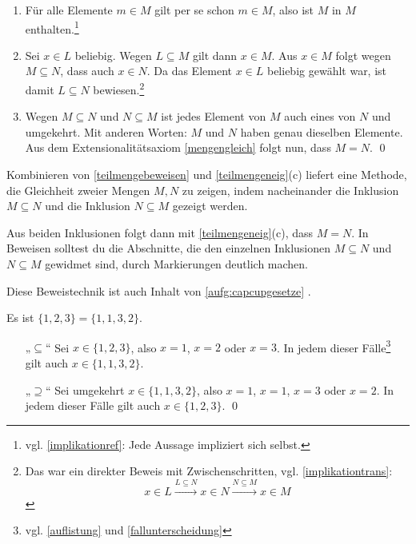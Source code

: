 \begin{bew}
    \begin{enumerate}
        \item Für alle Elemente $m\in M$ gilt per se schon $m\in M$, also ist $M$ in $M$ enthalten.\footnote{vgl. \cref{implikationref}: Jede Aussage impliziert sich selbst.}
        \item Sei $x\in L$ beliebig. Wegen $L\subseteq M$ gilt dann $x\in M$. Aus $x\in M$ folgt wegen $M\subseteq N$, dass auch $x\in N$. Da das Element $x\in L$ beliebig gewählt war, ist damit $L\subseteq N$ bewiesen.\footnote{Das war ein direkter Beweis mit Zwischenschritten, vgl. \cref{implikationtrans}:
            \[ x\in L\xrightarrow{L\subseteq N} x\in N \xrightarrow{N\subseteq M} x\in M \]}
        \item Wegen $M\subseteq N$ und $N\subseteq M$ ist jedes Element von $M$ auch eines von $N$ und umgekehrt. Mit anderen Worten: $M$ und $N$ haben genau dieselben Elemente. Aus dem Extensionalitätsaxiom \cref{mengengleich} folgt nun, dass $M=N$. \qed
    \end{enumerate}
\end{bew}


\begin{bem} \label{mengengleichbeweis}
    Kombinieren von \cref{teilmengebeweisen} und \cref{teilmengeneig}(c) liefert eine Methode, die Gleichheit zweier Mengen $M,N$ zu zeigen, indem nacheinander die Inklusion $M\subseteq N$ und die Inklusion $N\subseteq M$ gezeigt werden.
    
    Aus beiden Inklusionen folgt dann mit \cref{teilmengeneig}(c), dass $M=N$. In Beweisen solltest du die Abschnitte, die den einzelnen Inklusionen $M\subseteq N$ und $N\subseteq M$ gewidmet sind, durch Markierungen deutlich machen.
    
    Diese Beweistechnik ist auch Inhalt von \cref{aufg:capcupgesetze} .
\end{bem}


\begin{bsp}[*] \label{bsp:mengengleichbeweis}
    Es ist $\{1,2,3\}=\{1,1,3,2\}$.
\end{bsp}


\begin{bew}
    \begin{itemize}
        \item[„$\subseteq$“] Sei $x\in\{1,2,3\}$, also $x=1$, $x=2$ oder $x=3$. In jedem dieser Fälle\footnote{vgl. \cref{auflistung} und \cref{fallunterscheidung}} gilt auch $x\in\{1,1,3,2\}$.
        \item[„$\supseteq$“] Sei umgekehrt $x\in\{1,1,3,2\}$,  also $x=1$, $x=1$, $x=3$ oder $x=2$. In jedem dieser Fälle gilt auch $x\in\{1,2,3\}$. \qed
    \end{itemize}
\end{bew}



